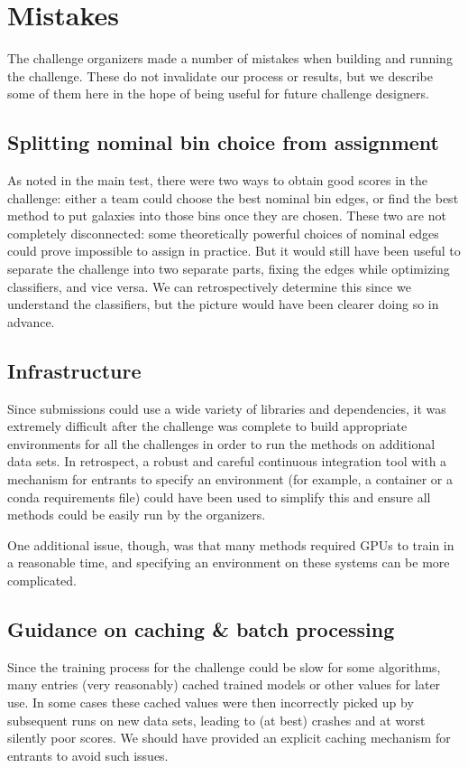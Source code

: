 \documentclass[twocolumn,twocolappendix]{aastex63}
\begin{document}
\section{Mistakes} \label{sec:mistakes}
The challenge organizers made a number of mistakes when building and running the challenge.
These do not invalidate our process or results, but we describe some of them here in the hope of
being useful for future challenge designers.

\subsection{Splitting nominal bin choice from assignment}
As noted in the main test, there were two ways to obtain good scores in the challenge: 
either a team could choose the best
nominal bin edges, or find the best method to put galaxies into those bins once they are chosen.
These two are not completely disconnected: some theoretically powerful choices of nominal edges
could prove impossible to assign in practice.  But it would still have been useful to separate
the challenge into two separate parts, fixing the edges while optimizing classifiers, and vice
versa.   We can retrospectively determine this since we understand the classifiers, but the picture
would have been clearer doing so in advance.

\subsection{Infrastructure}
Since submissions could use a wide variety of libraries and dependencies, it was extremely
difficult after the challenge was complete to build appropriate environments for all the challenges
in order to run the methods on additional data sets. In retrospect, a robust and careful
continuous integration tool with a mechanism for entrants to specify an environment (for example, a 
container or a {\sc conda} requirements file) could have been used to simplify this and ensure
all methods could be easily run by the organizers.

One additional issue, though, was that many methods required GPUs to train in a reasonable time,
and specifying an environment on these systems can be more complicated.

\subsection{Guidance on caching \& batch processing}
Since the training process for the challenge could be slow for some algorithms, many entries
(very reasonably) cached trained models or other values for later use.  In some cases these
cached values were then incorrectly picked up by subsequent runs on new data sets, leading
to (at best) crashes and at worst silently poor scores.  We should have provided an explicit
caching mechanism for entrants to avoid such issues.
\end{document}

